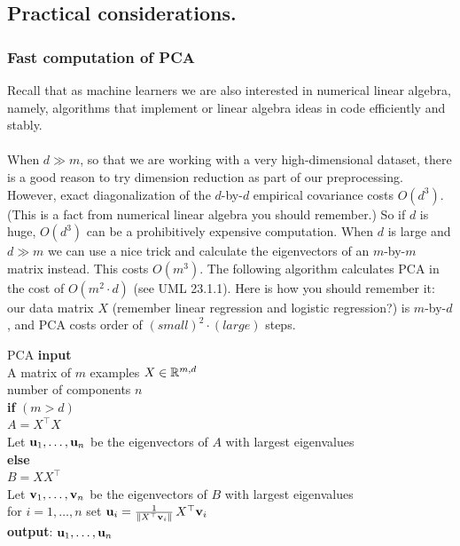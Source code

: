 \subsection{Practical considerations.}

      \subsubsection{Fast computation of PCA}

  Recall that as machine learners we are also interested in numerical linear
  algebra, namely, algorithms that implement or linear algebra ideas in code
  efficiently and stably.
\\~\\
When $d\gg m$, so that we are working with a very high-dimensional dataset,
there is a good reason to try dimension reduction as part of our preprocessing.
However, exact diagonalization of the $d$-by-$d$ empirical covariance costs
$O(d^3)$. (This is a fact from numerical linear algebra you should remember.) So
if $d$ is huge, $O(d^3)$ can be a prohibitively expensive computation. 
When $d$ is large and $d\gg m$ we can use a nice trick and calculate the
eigenvectors of an $m$-by-$m$ matrix instead. This costs $O(m^3)$. The 
following algorithm calculates PCA in the cost of $O(m^2\cdot d)$ (see UML
23.1.1). 
Here is how
you should remember it: our data matrix $X$ (remember linear regression and
logistic regression?) is $m$-by-$d$, and PCA costs order of 
$(small)^2\cdot(large)$ steps. 



  \begin{myalgo}{PCA}
\textbf{input}~ \+ \\
A matrix of $m$ examples $X \in \mathbb{R}^{m,d}$  \\
number of components $n$ \- \\
\textbf{if} $(m > d)$ \+ \\
    $A = X^\top X$ \\ 
    Let ${\mathbf u}_1,\ldots,{\mathbf u}_n$ be the eigenvectors of $A$ with largest eigenvalues \- \\
\textbf{else} \+ \\
    $B = X X^\top$ \\
    Let ${\mathbf v}_1,\ldots,{\mathbf v}_n$ be the eigenvectors of $B$ with largest
    eigenvalues \\
    for $i=1,\ldots,n$ set ${\mathbf u}_i = \frac{1}{\|X^\top
      {\mathbf v}_i\|} \, X^\top {\mathbf v}_i$ \- \\
\textbf{output}: ${\mathbf u}_1,\ldots,{\mathbf u}_n$ 
\end{myalgo}


